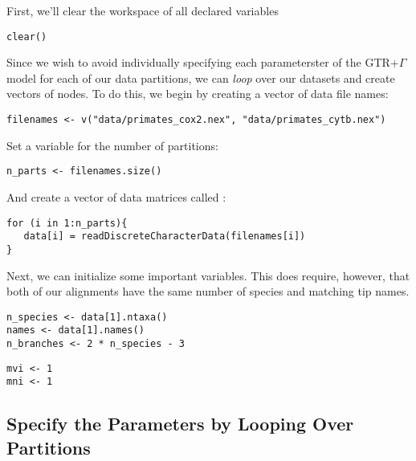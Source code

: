 First, we'll clear the workspace of all declared variables
{\tt \begin{snugshade*}
\begin{lstlisting}
clear()
\end{lstlisting}
\end{snugshade*}}

Since we wish to avoid individually specifying each parameterster of the GTR+$\Gamma$ model for each of our data partitions, we can \textit{loop} over our datasets and create vectors of nodes.
To do this, we begin by creating a vector of data file names:
{\tt \begin{snugshade*}
\begin{lstlisting}
filenames <- v("data/primates_cox2.nex", "data/primates_cytb.nex")
\end{lstlisting}
\end{snugshade*}}

Set a variable for the number of partitions:
{\tt \begin{snugshade*}
\begin{lstlisting}
n_parts <- filenames.size()
\end{lstlisting}
\end{snugshade*}}

And create a vector of data matrices called :
{\tt \begin{snugshade*}
\begin{lstlisting}
for (i in 1:n_parts){
   data[i] = readDiscreteCharacterData(filenames[i])
}
\end{lstlisting}
\end{snugshade*}}

Next, we can initialize some important variables. This does require, however, that both of our alignments have the same number of species and matching tip names.
{\tt \begin{snugshade*}
\begin{lstlisting}
n_species <- data[1].ntaxa()
names <- data[1].names()
n_branches <- 2 * n_species - 3
\end{lstlisting}
\end{snugshade*}}

{\tt \begin{snugshade*}
\begin{lstlisting}
mvi <- 1
mni <- 1
\end{lstlisting}
\end{snugshade*}}


\subsection{Specify the Parameters by Looping Over Partitions}

